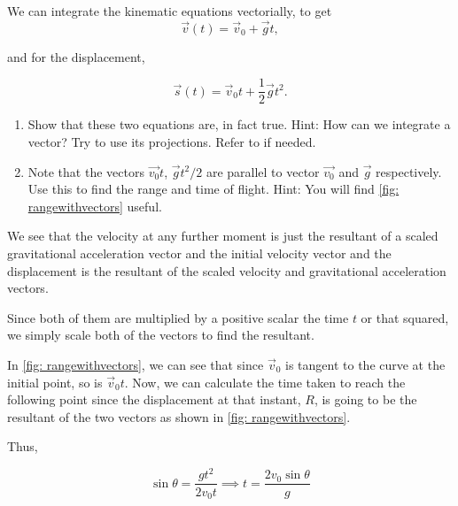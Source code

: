 \begin{exc}
    \begin{exercise}[points = 3]
        We can integrate the kinematic equations 
        vectorially, to get 
        \begin{equation*}
            \vec{v}(t) = \vec{v}_0 + \vec{g}t,
        \end{equation*}
        
        and for the displacement,
        
        \begin{equation*}
            \vec{s}(t) = \vec{v}_0t + \frac{1}{2}\vec{g}t^2.
        \end{equation*}

        \begin{enumerate}
            \item Show that these two equations are, in fact true. Hint: How can we integrate a vector? Try to use its projections. Refer to   if needed.
            \item Note that the vectors \(\vec{v_0}t\), \(\vec{g}t^2/2\) are parallel to vector \(\vec{v_0}\) and \(\vec{g}\) respectively. Use this to find the range and time of flight. Hint: You will find \cref{fig: rangewithvectors} useful. 
        \end{enumerate}
    \end{exercise}

    \begin{solution}
        We see that the velocity at any further moment is just the resultant of a scaled 
        gravitational acceleration vector and the initial velocity vector and the displacement is the resultant of 
        the scaled velocity and gravitational acceleration vectors. 
        
        Since both of them are multiplied by a positive scalar the time \(t\) or that squared, we simply
        scale both of the vectors to find the resultant.
        
        In \cref{fig: rangewithvectors}, we can see that since \(\vec{v}_0\) is tangent 
        to the curve at the initial point, so is \(\vec{v}_0t\). Now, we can calculate 
        the time taken to reach the following point since the displacement at that instant, 
        \(R\), is going to be the resultant of the two vectors as shown in \cref{fig: rangewithvectors}.
        
        Thus,

        \begin{equation*}
            \sin\theta = \frac{gt^2}{2v_0t} \implies t = \frac{2v_0\sin\theta}{g}
        \end{equation*}


\end{solution}
\end{exc}
